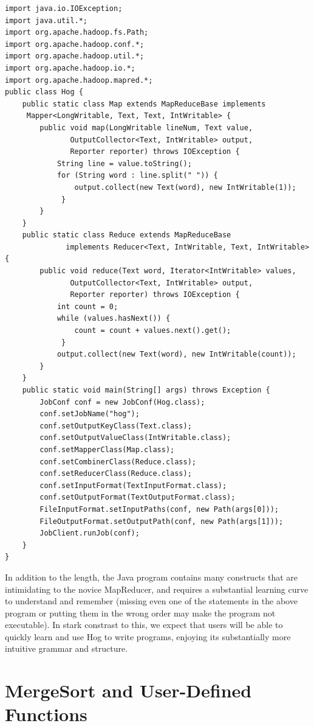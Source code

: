 \documentclass{report}
\begin{document}
\begin{verbatim}
import java.io.IOException;
import java.util.*;
import org.apache.hadoop.fs.Path;
import org.apache.hadoop.conf.*;
import org.apache.hadoop.util.*;
import org.apache.hadoop.io.*;
import org.apache.hadoop.mapred.*;
public class Hog {
    public static class Map extends MapReduceBase implements 
     Mapper<LongWritable, Text, Text, IntWritable> {
        public void map(LongWritable lineNum, Text value,  
               OutputCollector<Text, IntWritable> output, 
               Reporter reporter) throws IOException {
            String line = value.toString();
            for (String word : line.split(" ")) {
                output.collect(new Text(word), new IntWritable(1));
             }
        }
    }
    public static class Reduce extends MapReduceBase 
              implements Reducer<Text, IntWritable, Text, IntWritable> {
        public void reduce(Text word, Iterator<IntWritable> values,  
               OutputCollector<Text, IntWritable> output, 
               Reporter reporter) throws IOException {
            int count = 0;
            while (values.hasNext()) {
                count = count + values.next().get();
             }
            output.collect(new Text(word), new IntWritable(count));
        }
    }
    public static void main(String[] args) throws Exception {
        JobConf conf = new JobConf(Hog.class);
        conf.setJobName("hog");
        conf.setOutputKeyClass(Text.class);
        conf.setOutputValueClass(IntWritable.class);
        conf.setMapperClass(Map.class);
        conf.setCombinerClass(Reduce.class);
        conf.setReducerClass(Reduce.class);
        conf.setInputFormat(TextInputFormat.class);
        conf.setOutputFormat(TextOutputFormat.class);
        FileInputFormat.setInputPaths(conf, new Path(args[0]));
        FileOutputFormat.setOutputPath(conf, new Path(args[1]));
        JobClient.runJob(conf);
    }
}
\end{verbatim}

In addition to the length, the Java program contains many constructs that are intimidating to the novice MapReducer, and requires a substantial learning curve to understand and remember (missing even one of the statements in the above program or putting them in the wrong order may make the program not executable). In stark constrast to this, we expect that users will be able to quickly learn and use Hog to write programs, enjoying its substantially more intuitive grammar and structure.

\section{MergeSort and User-Defined Functions} \label{merge_sort} 
\end{document}
